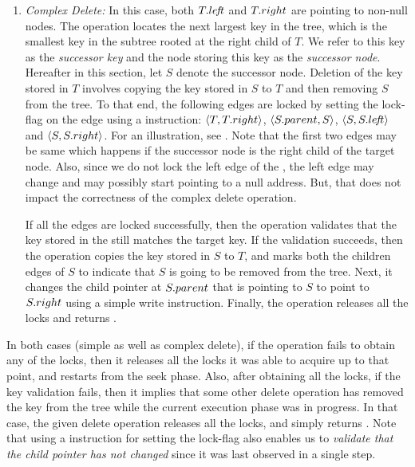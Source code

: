 \begin{enumerate}[label=(\alph*)]
\item \emph{Complex Delete:}
In this case, both $T.le\!f\!t{}$ and $T.right{}$ are pointing to non-null nodes. The operation locates the next largest key in the tree, which is the smallest key in the subtree rooted at the right child of $T$. We refer to this key as the \emph{successor key} and the node storing this key as the \emph{successor node}. Hereafter in this section, let 
$S$ denote the successor node. Deletion of the key stored in $T$ involves copying  the key stored in $S$ to $T$ and then removing $S$ from the tree. To that end, the following edges are locked by setting the lock-flag on the edge using a \CAS{} instruction: $\langle {T}, {T.right} \rangle$, $\langle {S.parent}, {S} \rangle$, $\langle {S}, {S.le\!f\!t} \rangle$ and $\langle {S}, {S.right} \rangle$. For an illustration, see . Note that the first two edges may be same which happens if the successor node is the right child of the target node. Also, since we do not lock the left edge of the \targetnode{}, the left edge may change and may possibly start pointing to a null address. But, that does not impact the correctness of the complex delete operation.



If all the edges are locked successfully, then the operation validates that the key stored in the \targetnode{} still matches the target key. If the validation succeeds, then  the operation copies the key stored in $S$ to $T$, and marks both the children edges of $S$ to indicate that $S$ is going to be removed from the tree. Next, it changes the child pointer at $S.parent$ that is pointing to $S$ to point to $S.right{}$ using a simple write instruction. Finally, the operation releases all the locks and returns \true{}.
\end{enumerate}

In both cases (simple as well as complex delete), if the operation fails to obtain any of the locks, then it releases all the locks it was able to acquire up to that point, and restarts from the seek phase. Also, after obtaining all the locks, if the key validation fails, then it implies that some other delete operation has removed the key from the tree while the current execution phase was in progress. In that case, the given delete operation releases all the locks,  and simply returns \false{}. Note that using a \CAS{} instruction for setting the lock-flag also enables us to \emph{validate that the child pointer has not changed} since it was last observed in a single step.

